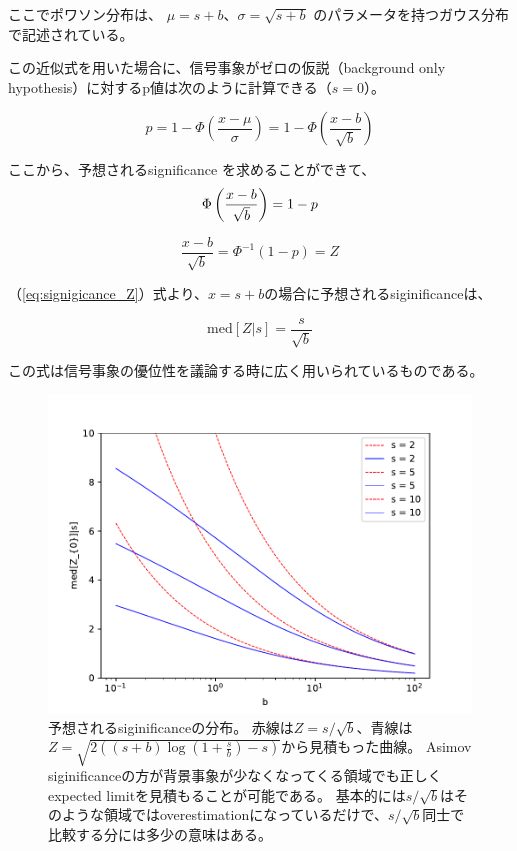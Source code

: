 ここでポワソン分布は、 $\mu = s+b$、$\sigma = \sqrt{s+b}$
のパラメータを持つガウス分布で記述されている。

この近似式を用いた場合に、信号事象がゼロの仮説（background only hypothesis）に対するp値は次のように計算できる（$s=0$）。

\begin{equation}
  p = 1 - \Phi \left(\frac{x-\mu}{\sigma} \right) = 1 - \Phi \left(\frac{x-b}{\sqrt{b}} \right)
\end{equation}

ここから、予想されるsignificance を求めることができて、
\begin{equation}
  \Phi \left(\frac{x-b}{\sqrt{b}} \right) = 1-p \\
\end{equation}

\begin{equation}\label{eq:signigicance_Z}
  \frac{x-b}{\sqrt{b}} = \Phi^{-1} (1-p) = Z
\end{equation}

（\ref{eq:signigicance_Z}）式より、$x=s+b$の場合に予想されるsiginificanceは、

\begin{equation}
  \mathrm{med}[Z|s] = \frac{s}{\sqrt{b}}
\end{equation}

この式は信号事象の優位性を議論する時に広く用いられているものである。

\begin{figure}[h]
  \centering
  \includegraphics[scale=0.8]{python/discovery_significance.pdf}
  \caption{予想されるsiginificanceの分布。
  赤線は$Z=s/\sqrt{b}$、青線は$Z=\sqrt{2\left((s+b)\log\left({1+\frac{s}{b}}\right)-s\right)}$から見積もった曲線。
  Asimov siginificanceの方が背景事象が少なくなってくる領域でも正しくexpected limitを見積もることが可能である。
  基本的には$s/\sqrt{b}$はそのような領域ではoverestimationになっているだけで、$s/\sqrt{b}$同士で比較する分には多少の意味はある。
  }
\end{figure}


